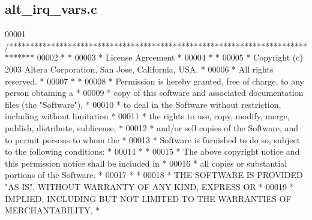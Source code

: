 \subsection{alt\+\_\+irq\+\_\+vars.\+c}
\label{alt__irq__vars_8c_source}

\begin{DoxyCode}
00001 \textcolor{comment}{/******************************************************************************}
00002 \textcolor{comment}{*                                                                             *}
00003 \textcolor{comment}{* License Agreement                                                           *}
00004 \textcolor{comment}{*                                                                             *}
00005 \textcolor{comment}{* Copyright (c) 2003 Altera Corporation, San Jose, California, USA.           *}
00006 \textcolor{comment}{* All rights reserved.                                                        *}
00007 \textcolor{comment}{*                                                                             *}
00008 \textcolor{comment}{* Permission is hereby granted, free of charge, to any person obtaining a     *}
00009 \textcolor{comment}{* copy of this software and associated documentation files (the "Software"),  *}
00010 \textcolor{comment}{* to deal in the Software without restriction, including without limitation   *}
00011 \textcolor{comment}{* the rights to use, copy, modify, merge, publish, distribute, sublicense,    *}
00012 \textcolor{comment}{* and/or sell copies of the Software, and to permit persons to whom the       *}
00013 \textcolor{comment}{* Software is furnished to do so, subject to the following conditions:        *}
00014 \textcolor{comment}{*                                                                             *}
00015 \textcolor{comment}{* The above copyright notice and this permission notice shall be included in  *}
00016 \textcolor{comment}{* all copies or substantial portions of the Software.                         *}
00017 \textcolor{comment}{*                                                                             *}
00018 \textcolor{comment}{* THE SOFTWARE IS PROVIDED "AS IS", WITHOUT WARRANTY OF ANY KIND, EXPRESS OR  *}
00019 \textcolor{comment}{* IMPLIED, INCLUDING BUT NOT LIMITED TO THE WARRANTIES OF MERCHANTABILITY,    *}

\end{DoxyCode}

